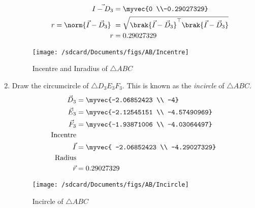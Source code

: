 \documentclass[11pt]{book}
\begin{document}
\begin{enumerate}[label=\thesection.\arabic*.,ref=\thesection.\theenumi]
\begin{enumerate}
\begin{align}
       \vec{I - D_3} &= \myvec{0 \\-0.29027329} \\
 r= \norm{\vec{I}-\vec{D}_3}\ &=  \sqrt{\brak{\vec{I}-\vec{D}_3}^{\top}\brak{\vec{I}-\vec{D}_3}} \\
 r &= 0.29027329
   \end{align}
\end{enumerate}
\begin{figure}[H]
\texttt{[image: /sdcard/Documents/figs/AB/Incentre]}
\caption{Incentre and Inradius of $\triangle ABC$}
\label{fig:fig2}
\end{figure}

\item Draw the circumcircle of $\triangle D_3E_3F_3$.  This is known as the {\em incircle} of $\triangle ABC$. \\
\solution 
\begin{align}
    \vec{D}_3 &= \myvec{-2.06852423  \\ -4} \\
    \vec{E}_3 &= \myvec{-2.12545151  \\ -4.57490969} \\
    \vec{F}_3 &= \myvec{-1.93871006  \\ -4.03064497}\\
\text{Incentre}\\ 
    \vec{I} &= \myvec{ -2.06852423 \\ -4.29027329}\\
\text{Radius}\\
 \vec{r} &= 0.29027329
\end{align}
\begin{figure}[H]
\texttt{[image: /sdcard/Documents/figs/AB/Incircle]}
\caption{Incircle of $\triangle ABC$}
\label{fig:fig3}
\end{figure}
  

\end{enumerate}
\end{document}
